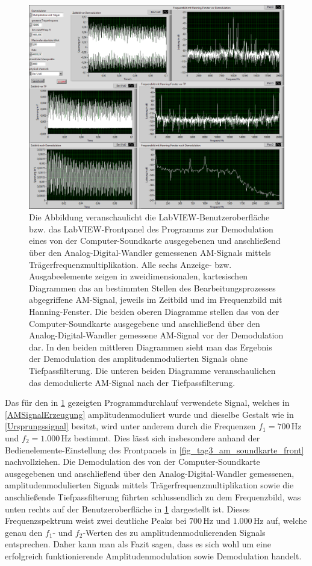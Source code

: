 \documentclass[
a4paper,
12pt,
pagesize,
ngerman
]{scrartcl}
\begin{document}
	\begin{figure}[H]
		\centering
		\includegraphics[width=1.0\textwidth]{EIRE2018Dateien/Tag4/traegerMultOszi/Oszilloskop__modifiziertp}
		\caption{Die Abbildung veranschaulicht die LabVIEW-Benutzeroberfläche bzw. das LabVIEW-Frontpanel des Programms zur Demodulation eines von der Computer-Soundkarte ausgegebenen und anschließend über den Analog-Digital-Wandler gemessenen AM-Signals mittels Trägerfrequenzmultiplikation. Alle sechs Anzeige- bzw. Ausgabeelemente zeigen in zweidimensionalen, kartesischen Diagrammen das an bestimmten Stellen des Bearbeitungsprozesses abgegriffene AM-Signal, jeweils im Zeitbild und im Frequenzbild mit Hanning-Fenster. Die beiden oberen Diagramme stellen das von der Computer-Soundkarte ausgegebene und anschließend über den Analog-Digital-Wandler gemessene AM-Signal vor der Demodulation dar. In den beiden mittleren Diagrammen sieht man das Ergebnis der Demodulation des amplitudenmodulierten Signals ohne Tiefpassfilterung. Die unteren beiden Diagramme veranschaulichen das demodulierte AM-Signal nach der Tiefpassfilterung.}
		\label{MultiTraegerFrontpanel}
	\end{figure}
	
	Das für den in \cref{MultiTraegerFrontpanel} gezeigten Programmdurchlauf verwendete Signal, welches in \cref{AMSignalErzeugung} amplitudenmoduliert wurde und dieselbe Gestalt wie in \cref{Ursprungssignal} besitzt, wird unter anderem durch die Frequenzen $f_1 = 700\,$Hz und $f_2 = 1.000\,$Hz bestimmt. 
	Dies lässt sich insbesondere anhand der Bedienelemente-Einstellung des Frontpanels in \cref{fig_tag3_am_soundkarte_front} nachvollziehen. 
	Die Demodulation des von der Computer-Soundkarte ausgegebenen und anschließend über den Analog-Digital-Wandler gemessenen, amplitudenmodulierten Signals mittels Trägerfrequenzmultiplikation sowie die anschließende Tiefpassfilterung führten schlussendlich zu dem Frequenzbild, was unten rechts auf der Benutzeroberfläche in \cref{MultiTraegerFrontpanel} dargestellt ist.
	Dieses Frequenzspektrum weist zwei deutliche Peaks bei $700\,$Hz und $1.000\,$Hz auf, welche genau den $f_1$- und $f_2$-Werten des zu amplitudenmodulierenden Signals entsprechen. 
	Daher kann man als Fazit sagen, dass es sich wohl um eine erfolgreich funktionierende Amplitudenmodulation sowie Demodulation handelt. 
	
\end{document}
